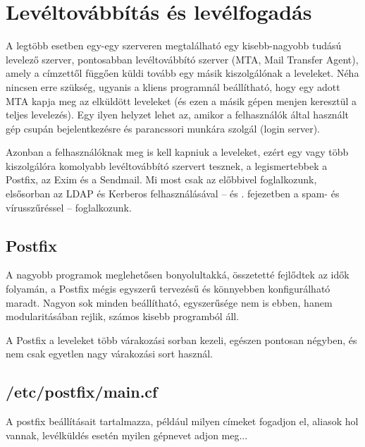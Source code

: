 \chapter{Levéltovábbítás és levélfogadás}\label{chap:Postfix}

A legtöbb esetben egy-egy szerveren megtalálható egy kisebb-nagyobb tudású levelező szerver, pontosabban levéltovábbító
szerver (MTA, Mail Transfer Agent), amely a címzettől függően küldi tovább egy másik kiszolgálónak a leveleket. Néha
nincsen erre szükség, ugyanis a kliens programnál beállítható, hogy egy adott MTA kapja meg az elküldött leveleket (és
ezen a másik gépen menjen keresztül a teljes levelezés). Egy ilyen helyzet lehet az, amikor a felhasználók által
használt gép csupán bejelentkezésre és parancssori munkára szolgál (login server).

Azonban a felhasználóknak meg is kell kapniuk a leveleket, ezért egy vagy több kiszolgálóra komolyabb levéltovábbító
szervert tesznek, a legismertebbek a Postfix, az Exim és a Sendmail. Mi most csak az előbbivel foglalkozunk, elsősorban az
LDAP és Kerberos felhasználásával -- és . fejezetben a spam- és vírusszűréssel -- foglalkozunk.

\section{Postfix}
A nagyobb programok meglehetősen bonyolultakká, összetetté fejlődtek az idők folyamán, a Postfix mégis egyszerű
tervezésű és könnyebben konfigurálható maradt. Nagyon sok minden beállítható, egyszerűsége nem is ebben, hanem
modularitásában rejlik, számos kisebb programból áll.

A Postfix a leveleket több várakozási sorban kezeli, egészen pontosan négyben, és nem csak egyetlen nagy várakozási sort
használ.








\section{/etc/postfix/main.cf}
A postfix beállításait tartalmazza, például milyen címeket fogadjon el, aliasok hol vannak, levélküldés esetén myilen
gépnevet adjon meg...

